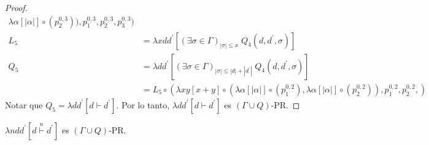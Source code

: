 \begin{proof}
\begin{align*}
                        \lambda \alpha \left[ |\alpha|\right] \circ (p_{2}^{0,3})
                    ),
                    p_{1}^{0,3},
                    p_{2}^{0,3},
                    p_{3}^{0,3}
                  )\\[20pt]
      L_5 &=  \lambda x d d^{\prime }
                \left[
                  (\exists \sigma \in \Gamma)_{|\sigma| \leq x}\; Q_4(d,d^{\prime },\sigma)
                \right] \\[10pt]
      Q_5 &=  \lambda d d^{\prime }
                \left[
                  (\exists \sigma \in \Gamma)_{|\sigma| \leq |d| + |d^{\prime}|}\; Q_4(d,d^{\prime },\sigma)
                \right] \\
          &= L_5  \circ (
                    \lambda x y \left[ x + y \right]
                      \circ(
                        \lambda \alpha \left[ |\alpha|\right] \circ (p_{1}^{0,2}),
                        \lambda \alpha \left[ |\alpha|\right] \circ (p_{2}^{0,2})
                    ),
                    p_{1}^{0,2},
                    p_{2}^{0,2},
                  )
    \end{align*}
    Notar que $Q_5 = \lambda dd^{\prime } \left[ d\vdash d^{\prime }\right]$. Por lo tanto,
    $\lambda dd^{\prime } \left[ d\vdash d^{\prime }\right]$ es $(\Gamma \cup Q)$-PR.
  \end{proof}

	\begin{proposition}
		\PN $\lambda ndd^{\prime} \left[d \overset{n}{\vdash} d^{\prime}\right]$ es $(\Gamma \cup Q)$-PR.
	\end{proposition}

